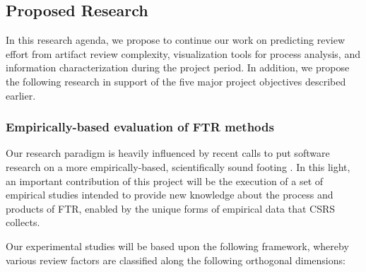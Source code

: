 
\subsection{Proposed Research}
\label{sec:proposed-research}

In this research agenda, we propose to continue our work on predicting
review effort from artifact review complexity, visualization tools for
process analysis, and information characterization during the project
period.  In addition, we propose the following research in support of the
five major project objectives described earlier.

\subsubsection{Empirically-based evaluation of FTR methods}

Our research paradigm is heavily influenced by recent calls to put software
research on a more empirically-based, scientifically sound footing
\cite{Tichy93,Berry92,Cohen88,Basili86,Basili84}.  In this light, an
important contribution of this project will be the execution of a set of
empirical studies intended to provide new knowledge about the process and
products of FTR, enabled by the unique forms of empirical data that CSRS
collects.

Our experimental studies will be based upon the following framework, 
whereby various review factors are classified along the following
orthogonal dimensions:

